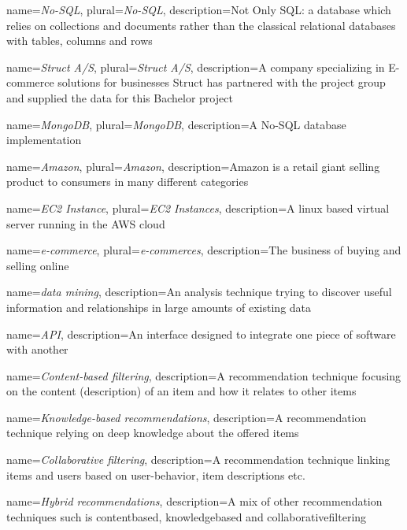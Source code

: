 
{
	name=\textit{No-SQL},
	plural=\textit{No-SQL},
	description={Not Only SQL: a database which relies on collections and documents rather than the classical relational databases with tables, columns and rows}
}

{
	name=\textit{Struct A/S},
	plural=\textit{Struct A/S},
	description={A company specializing in E-commerce solutions for businesses Struct has partnered with the project group and supplied the data for this Bachelor project}
}

{
	name=\textit{MongoDB},
	plural=\textit{MongoDB},
	description={A No-SQL database implementation}
}

{
	name=\textit{Amazon},
	plural=\textit{Amazon},
	description={Amazon is a retail giant selling product to consumers in many different categories}
}

{
	name=\textit{EC2 Instance},
	plural=\textit{EC2 Instances},
	description={A linux based virtual server running in the AWS cloud}
}

{
	name=\textit{e-commerce},
	plural=\textit{e-commerces},
	description={The business of buying and selling online}
}

{
	name=\textit{data mining},
	description={An analysis technique trying to discover useful information and relationships in large amounts of existing data}
}

{
	name=\textit{API},
	description={An interface designed to integrate one piece of software with another}
}

{
	name=\textit{Content-based filtering},
	description={A recommendation technique focusing on the content (description) of an item and how it relates to other items}
}

{
	name=\textit{Knowledge-based recommendations},
	description={A recommendation technique relying on deep knowledge about the offered items}
}

{
	name=\textit{Collaborative filtering},
	description={A recommendation technique linking items and users based on user-behavior, item descriptions etc.}
}

{
	name=\textit{Hybrid recommendations},
	description={A mix of other recommendation techniques such is \gls{contentbased}, \gls{knowledgebased} and \gls{collaborativefiltering}}
}

